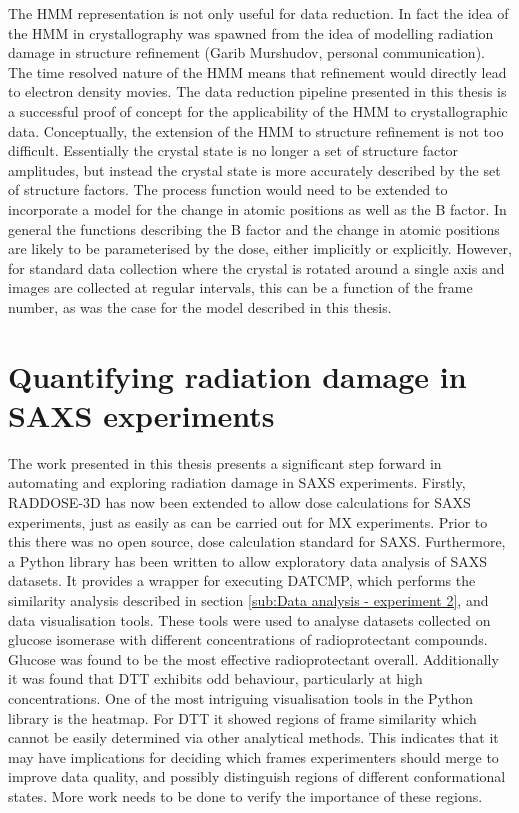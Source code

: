 The HMM representation is not only useful for data reduction.
In fact the idea of the HMM in crystallography was spawned from the idea of modelling radiation damage in structure refinement (Garib Murshudov, personal communication).
The time resolved nature of the HMM means that refinement would directly lead to electron density movies.
The data reduction pipeline presented in this thesis is a successful proof of concept for the applicability of the HMM to crystallographic data.
Conceptually, the extension of the HMM to structure refinement is not too difficult.
Essentially the crystal state is no longer a set of structure factor amplitudes, but instead the crystal state is more accurately described by the set of structure factors.
The process function would need to be extended to incorporate a model for the change in atomic positions as well as the B factor.
In general the functions describing the B factor and the change in atomic positions are likely to be parameterised by the dose, either implicitly or explicitly.
However, for standard data collection where the crystal is rotated around a single axis and images are collected at regular intervals, this can be a function of the frame number, as was the case for the model described in this thesis.

\section{Quantifying radiation damage in SAXS experiments}
\label{sec:Quantifying radiation damage in SAXS experiments}
The work presented in this thesis presents a significant step forward in automating and exploring radiation damage in SAXS experiments.
Firstly, RADDOSE-3D has now been extended to allow dose calculations for SAXS experiments, just as easily as can be carried out for MX experiments.
Prior to this there was no open source, dose calculation standard for SAXS.
Furthermore, a Python library has been written to allow exploratory data analysis of SAXS datasets.
It provides a wrapper for executing DATCMP, which performs the similarity analysis described in section \ref{sub:Data analysis - experiment 2}, and data visualisation tools.
These tools were used to analyse datasets collected on glucose isomerase with different concentrations of radioprotectant compounds.
Glucose was found to be the most effective radioprotectant overall.
Additionally it was found that DTT exhibits odd behaviour, particularly at high concentrations.
One of the most intriguing visualisation tools in the Python library is the heatmap.
For DTT it showed regions of frame similarity which cannot be easily determined via other analytical methods.
This indicates that it may have implications for deciding which frames experimenters should merge to improve data quality, and possibly distinguish regions of different conformational states.
More work needs to be done to verify the importance of these regions.
